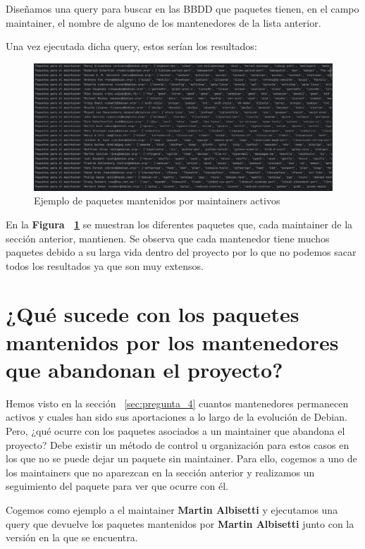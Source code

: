\documentclass[a4paper, 12pt]{book}
\begin{document}
Diseñamos una query para buscar en las BBDD que paquetes tienen, en el campo maintainer, el nombre de alguno de los mantenedores de la lista anterior.

Una vez ejecutada dicha query, estos serían los resultados:

\begin{figure}[h]
\centering
\includegraphics[width=18cm, keepaspectratio]{img/pregunta_4.1.png}
\caption{Ejemplo de paquetes mantenidos por maintainers activos}
\label{fig:paquetes_maintainers_activos}
\end{figure}

En la \textbf{Figura ~\ref{fig:paquetes_maintainers_activos}} se muestran los diferentes paquetes que, cada maintainer de la sección anterior, mantienen. Se observa que cada mantenedor tiene muchos paquetes debido a su larga vida dentro del proyecto por lo que no podemos sacar todos los resultados ya que son muy extensos.


\section{¿Qué sucede con los paquetes mantenidos por los mantenedores que abandonan el proyecto?}
\label{sec:pregunta_5}
Hemos visto en la sección ~\ref{sec:pregunta_4} cuantos mantenedores permanecen activos y cuales han sido sus aportaciones a lo largo de la evolución de Debian. 
Pero, ¿qué ocurre con los paquetes asociados a un maintainer que abandona el proyecto?
Debe existir un método de control u organización para estos casos en los que no se puede dejar un paquete sin maintainer.
Para ello, cogemos a uno de los maintainers que no aparezcan en la sección anterior y realizamos un seguimiento del paquete para ver que ocurre con él.

Cogemos como ejemplo a el maintainer \textbf{Martin Albisetti} y ejecutamos una query que devuelve los paquetes mantenidos por \textbf{Martin Albisetti} junto con la versión en la que se encuentra.
\end{document}
